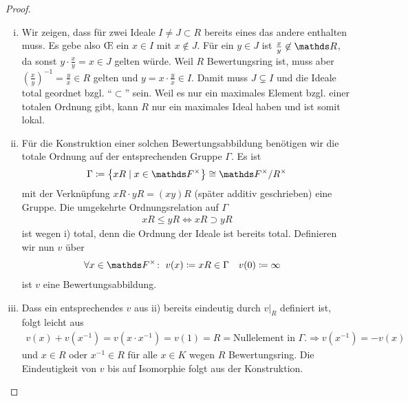 \documentclass[ngerman,fontsize=11pt, paper=a4, parskip=half, titlepage=true, toc=bib]{scrartcl}
\begin{document}
\begin{Lem}
  \begin{proof}
    \begin{enumerate}[i)]
    \item Wir zeigen, dass für zwei Ideale $I\neq J\subset R$ bereits
      eines das andere enthalten muss. Es gebe also \OE{} ein $x\in I$
      mit $x\not\in J$. Für ein $y\in J$ ist $\frac{x}{y}\not\in\R$,
      da sonst $y\cdot \frac{x}{y}=x\in J$ gelten würde.
      Weil $R$ Bewertungsring ist, muss aber
      $(\frac{x}{y})^{-1}=\frac{y}{x}\in R$ gelten und $y=x\cdot
      \frac{y}{x}\in I$. Damit muss $J\subsetneq I$ und die
      Ideale total geordnet bzgl. \enquote{$\subset$} sein.
      Weil es nur ein maximales Element bzgl. einer totalen Ordnung
      gibt, kann $R$ nur ein maximales Ideal haben und ist somit
      lokal.
    \item Für die Konstruktion einer solchen Bewertungsabbildung
      benötigen wir die totale Ordnung auf der entsprechenden Gruppe $\Gamma$.
      Es ist
      \begin{gather*}
        \Gamma \coloneqq \left\{ xR \mid x\in \Fx \right\}\cong\Fx/R^{\times}
      \end{gather*}
      mit der Verknüpfung $xR\cdot yR=(xy)R$ (später additiv
      geschrieben) eine Gruppe. Die umgekehrte Ordnungsrelation
      auf $\Gamma$
      \begin{gather*}
        xR\leq yR \Longleftrightarrow xR \supset yR
      \end{gather*}
      ist wegen i) total, denn die Ordnung der Ideale ist bereits total.
      Definieren wir nun $v$ über
      \begin{align*}
        \forall x\in \Fx\colon\;v(x)&\coloneqq xR\in\Gamma
        &v(0)&\coloneqq \infty
      \end{align*}
      ist $v$ eine Bewertungsabbildung. 
    \item Dass ein entsprechendes $v$ aus ii) bereits eindeutig
      durch $v|_{R}$ definiert ist, folgt leicht aus
      \begin{gather*}
        v(x)+v(x^{-1}) = v(x\cdot x^{-1}) = v(1) = R  =
        \text{Nullelement in }\Gamma.
        \Longrightarrow v(x^{-1})=-v(x)
      \end{gather*}
      und $x\in R$ oder $x^{-1}\in R$ für alle $x\in K$ wegen $R$
      Bewertungsring.
      Die Eindeutigkeit von $v$ bis auf Isomorphie folgt aus der
      Konstruktion.
    \end{enumerate}
  \end{proof}
\end{Lem}
\end{document}
